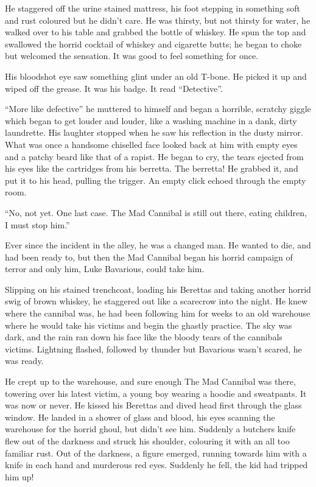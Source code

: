 He staggered off the urine stained mattress, his foot stepping in
something soft and rust coloured but he didn't care. He was
thirsty, but not thirsty for water, he walked over to his table and
grabbed the bottle of whiskey. He spun the top and swallowed the
horrid cocktail of whiskey and cigarette butts; he began to choke
but welcomed the sensation. It was good to feel something for
once.



His bloodshot eye saw something glint under an old T-bone. He
picked it up and wiped off the grease. It was his badge. It read
``Detective''.

``More like defective'' he muttered to himself and began
a horrible, scratchy giggle which began to get louder and louder,
like a washing machine in a dank, dirty laundrette. His laughter
stopped when he saw his reflection in the dusty mirror. What was
once a handsome chiselled face looked back at him with empty eyes
and a patchy beard like that of a rapist. He began to cry, the
tears ejected from his eyes like the cartridges from his berretta.
The berretta! He grabbed it, and put it to his head, pulling the
trigger. An empty click echoed through the empty room.



``No, not yet. One last case. The Mad Cannibal is still out
there, eating children, I must stop him.''



Ever since the incident in the alley, he was a changed man. He
wanted to die, and had been ready to, but then the Mad Cannibal
began his horrid campaign of terror and only him, Luke Bavarious,
could take him.



Slipping on his stained trenchcoat, loading his Berettas and taking
another horrid swig of brown whiskey, he staggered out like a
scarecrow into the night. He knew where the cannibal was, he had
been following him for weeks to an old warehouse where he would
take his victims and begin the ghastly practice. The sky was dark,
and the rain ran down his face like the bloody tears of the
cannibals victims. Lightning flashed, followed by thunder but
Bavarious wasn't scared, he was ready.



He crept up to the warehouse, and sure enough The Mad Cannibal was
there, towering over his latest victim, a young boy wearing a
hoodie and sweatpants. It was now or never. He kissed his Berettas
and dived head first through the glass window. He landed in a
shower of glass and blood, his eyes scanning the warehouse for the
horrid ghoul, but didn't see him. Suddenly a butchers knife
flew out of the darkness and struck his shoulder, colouring it with
an all too familiar rust. Out of the darkness, a figure emerged,
running towards him with a knife in each hand and murderous red
eyes. Suddenly he fell, the kid had tripped him up!



